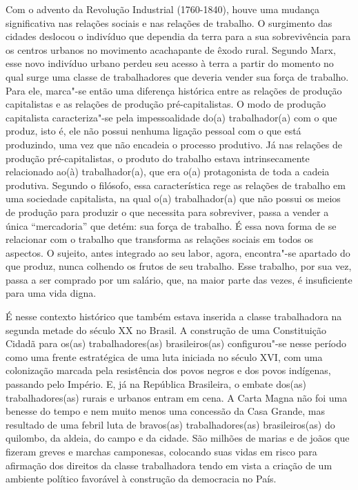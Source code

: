 Com o advento da Revolução Industrial (1760-1840), houve uma mudança
significativa nas relações sociais e nas relações de trabalho. O
surgimento das cidades deslocou o indivíduo que dependia da terra para a
sua sobrevivência para os centros urbanos no movimento acachapante de
êxodo rural. Segundo Marx, esse novo indivíduo urbano perdeu seu acesso
à terra a partir do momento no qual surge uma classe de trabalhadores
que deveria vender sua força de trabalho.
Para ele, marca"-se então uma diferença
histórica entre as relações de produção capitalistas e as relações de
produção pré-capitalistas. O modo de produção capitalista caracteriza"-se
pela impessoalidade do(a) trabalhador(a) com o que produz, isto é, ele
não possui nenhuma ligação pessoal com o que está produzindo, uma vez
que não encadeia o processo produtivo. Já nas relações de produção
pré-capitalistas, o produto do trabalho estava intrinsecamente
relacionado ao(à) trabalhador(a), que era o(a) protagonista de toda a
cadeia produtiva. Segundo o filósofo, essa característica rege as
relações de trabalho em uma sociedade capitalista, na qual o(a)
trabalhador(a) que não possui os meios de produção para produzir o que
necessita para sobreviver, passa a vender a única ``mercadoria'' que
detém: sua força de trabalho. É essa nova forma de se relacionar com o
trabalho que transforma as relações sociais em todos os aspectos. O
sujeito, antes integrado ao seu labor, agora, encontra"-se apartado do
que produz, nunca colhendo os frutos de seu trabalho. Esse trabalho, por
sua vez, passa a ser comprado por um salário, que, na maior parte das
vezes, é insuficiente para uma vida digna.

É nesse contexto histórico que também estava inserida a classe
trabalhadora na segunda metade do século XX no Brasil. A construção de
uma Constituição Cidadã para os(as) trabalhadores(as) brasileiros(as)
configurou"-se nesse período como uma frente estratégica de uma luta
iniciada no século XVI, com uma colonização marcada pela resistência dos
povos negros e dos povos indígenas, passando pelo Império. E, já na
República Brasileira, o embate dos(as) trabalhadores(as) rurais e
urbanos entram em cena. A Carta Magna não foi uma benesse do tempo e nem
muito menos uma concessão da Casa Grande, mas resultado de uma febril
luta de bravos(as) trabalhadores(as) brasileiros(as) do quilombo, da
aldeia, do campo e da cidade. São milhões de marias e de joãos que
fizeram greves e marchas camponesas, colocando suas vidas em risco para
afirmação dos direitos da classe trabalhadora tendo em vista a criação
de um ambiente político favorável à construção da democracia no País.

